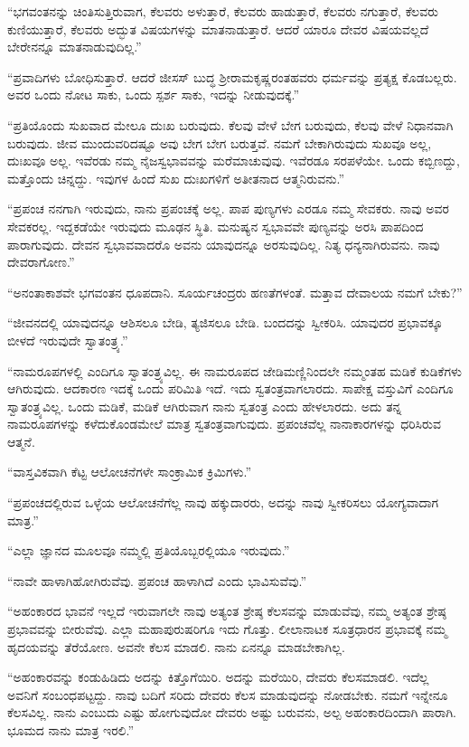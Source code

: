  “ಭಗವಂತನನ್ನು ಚಿಂತಿಸುತ್ತಿರುವಾಗ, ಕೆಲವರು ಅಳುತ್ತಾರೆ, ಕೆಲವರು ಹಾಡುತ್ತಾರೆ, ಕೆಲವರು ನಗುತ್ತಾರೆ, ಕೆಲವರು ಕುಣಿಯುತ್ತಾರೆ, ಕೆಲವರು ಅದ್ಭುತ ವಿಷಯಗಳನ್ನು ಮಾತನಾಡುತ್ತಾರೆ. ಆದರೆ ಯಾರೂ ದೇವರ ವಿಷಯವಲ್ಲದೆ ಬೇರೇನನ್ನೂ ಮಾತನಾಡುವುದಿಲ್ಲ.” 

 “ಪ್ರವಾದಿಗಳು ಬೋಧಿಸುತ್ತಾರೆ. ಆದರೆ ಜೀಸಸ್ ಬುದ್ಧ ಶ‍್ರೀರಾಮಕೃಷ್ಣರಂತಹವರು ಧರ್ಮವನ್ನು ಪ್ರತ್ಯಕ್ಷ ಕೊಡಬಲ್ಲರು. ಅವರ ಒಂದು ನೋಟ ಸಾಕು, ಒಂದು ಸ್ಪರ್ಶ ಸಾಕು, ಇದನ್ನು ನೀಡುವುದಕ್ಕೆ.” 

 “ಪ್ರತಿಯೊಂದು ಸುಖವಾದ ಮೇಲೂ ದುಃಖ ಬರುವುದು. ಕೆಲವು ವೇಳೆ ಬೇಗ ಬರುವುದು, ಕೆಲವು ವೇಳೆ ನಿಧಾನವಾಗಿ ಬರುವುದು. ಜೀವ ಮುಂದುವರಿದಷ್ಟೂ ಅವು ಬೇಗ ಬೇಗ ಬರುತ್ತವೆ. ನಮಗೆ ಬೇಕಾಗಿರುವುದು ಸುಖವೂ ಅಲ್ಲ, ದುಃಖವೂ ಅಲ್ಲ. ಇವೆರಡು ನಮ್ಮ ನೈಜಸ್ವಭಾವವನ್ನು ಮರೆಮಾಚುವುವು. ಇವೆರಡೂ ಸರಪಳೆಯೇ. ಒಂದು ಕಬ್ಬಿಣದ್ದು, ಮತ್ತೊಂದು ಚಿನ್ನದ್ದು. ಇವುಗಳ ಹಿಂದೆ ಸುಖ ದುಃಖಗಳಿಗೆ ಅತೀತನಾದ ಆತ್ಮನಿರುವನು.” 

 “ಪ್ರಪಂಚ ನನಗಾಗಿ ಇರುವುದು, ನಾನು ಪ್ರಪಂಚಕ್ಕೆ ಅಲ್ಲ. ಪಾಪ ಪುಣ್ಯಗಳು ಎರಡೂ ನಮ್ಮ ಸೇವಕರು. ನಾವು ಅವರ ಸೇವಕರಲ್ಲ. ಇದ್ದಕಡೆಯೇ ಇರುವುದು ಮೂಢನ ಸ್ಥಿತಿ. ಮನುಷ್ಯನ ಸ್ವಭಾವವೇ ಪುಣ್ಯವನ್ನು ಅರಸಿ ಪಾಪದಿಂದ ಪಾರಾಗುವುದು. ದೇವನ ಸ್ವಭಾವವಾದರೊ ಅವನು ಯಾವುದನ್ನೂ ಅರಸುವುದಿಲ್ಲ. ನಿತ್ಯ ಧನ್ಯನಾಗಿರುವನು. ನಾವು ದೇವರಾಗೋಣ.” 

 “ಅನಂತಾಕಾಶವೇ ಭಗವಂತನ ಧೂಪದಾನಿ. ಸೂರ್ಯಚಂದ್ರರು ಹಣತೆಗಳಂತೆ. ಮತ್ತಾವ ದೇವಾಲಯ ನಮಗೆ ಬೇಕು?” 

 “ಜೀವನದಲ್ಲಿ ಯಾವುದನ್ನೂ ಆಶಿಸಲೂ ಬೇಡಿ, ತ್ಯಜಿಸಲೂ ಬೇಡಿ. ಬಂದದನ್ನು ಸ್ವೀಕರಿಸಿ. ಯಾವುದರ ಪ್ರಭಾವಕ್ಕೂ ಬೀಳದೆ ಇರುವುದೇ ಸ್ವಾತಂತ್ರ್ಯ.” 

 “ನಾಮರೂಪಗಳಲ್ಲಿ ಎಂದಿಗೂ ಸ್ವಾತಂತ್ರ್ಯವಿಲ್ಲ. ಈ ನಾಮರೂಪದ ಜೇಡಿಮಣ್ಣಿನಿಂದಲೇ ನಮ್ಮಂತಹ ಮಡಿಕೆ ಕುಡಿಕೆಗಳು ಆಗಿರುವುದು. ಆದಕಾರಣ ಇದಕ್ಕೆ ಒಂದು ಪರಿಮಿತಿ ಇದೆ. ಇದು ಸ್ವತಂತ್ರವಾಗಲಾರದು. ಸಾಪೇಕ್ಷ ವಸ್ತುವಿಗೆ ಎಂದಿಗೂ ಸ್ವಾತಂತ್ರ್ಯವಿಲ್ಲ. ಒಂದು ಮಡಿಕೆ, ಮಡಿಕೆ ಆಗಿರುವಾಗ ನಾನು ಸ್ವತಂತ್ರ ಎಂದು ಹೇಳಲಾರದು. ಅದು ತನ್ನ ನಾಮರೂಪಗಳನ್ನು ಕಳೆದುಕೊಂಡಮೇಲೆ ಮಾತ್ರ ಸ್ವತಂತ್ರವಾಗುವುದು. ಪ್ರಪಂಚವೆಲ್ಲ ನಾನಾಕಾರಗಳನ್ನು ಧರಿಸಿರುವ ಆತ್ಮನೆ. 

 “ವಾಸ್ತವಿಕವಾಗಿ ಕೆಟ್ಟ ಆಲೋಚನೆಗಳೇ ಸಾಂಕ್ರಾಮಿಕ ಕ್ರಿಮಿಗಳು.” 

 “ಪ್ರಪಂಚದಲ್ಲಿರುವ ಒಳ್ಳೆಯ ಆಲೋಚನೆಗೆಲ್ಲ ನಾವು ಹಕ್ಕುದಾರರು, ಅದನ್ನು ನಾವು ಸ್ವೀಕರಿಸಲು ಯೋಗ್ಯವಾದಾಗ ಮಾತ್ರ.” 

 “ಎಲ್ಲಾ ಜ್ಞಾನದ ಮೂಲವೂ ನಮ್ಮಲ್ಲಿ ಪ್ರತಿಯೊಬ್ಬರಲ್ಲಿಯೂ ಇರುವುದು.” 

 “ನಾವೇ ಹಾಳಾಗಿಹೋಗಿರುವೆವು. ಪ್ರಪಂಚ ಹಾಳಾಗಿದೆ ಎಂದು ಭಾವಿಸುವೆವು.” 

 “ಅಹಂಕಾರದ ಭಾವನೆ ಇಲ್ಲದೆ ಇರುವಾಗಲೇ ನಾವು ಅತ್ಯಂತ ಶ್ರೇಷ್ಠ ಕೆಲಸವನ್ನು ಮಾಡುವೆವು, ನಮ್ಮ ಅತ್ಯಂತ ಶ್ರೇಷ್ಠ ಪ್ರಭಾವವನ್ನು ಬೀರುವೆವು. ಎಲ್ಲಾ ಮಹಾಪುರುಷರಿಗೂ ಇದು ಗೊತ್ತು. ಲೀಲಾನಾಟಕ ಸೂತ್ರಧಾರನ ಪ್ರಭಾವಕ್ಕೆ ನಮ್ಮ ಹೃದಯವನ್ನು ತೆರೆಯೋಣ. ಅವನೇ ಕೆಲಸ ಮಾಡಲಿ. ನಾನು ಏನನ್ನೂ ಮಾಡಬೇಕಾಗಿಲ್ಲ. 

 “ಅಹಂಕಾರವನ್ನು ಕಂಡುಹಿಡಿದು ಅದನ್ನು ಕಿತ್ತೊಗೆಯಿರಿ. ಅದನ್ನು ಮರೆಯಿರಿ, ದೇವರು ಕೆಲಸಮಾಡಲಿ. ಇದೆಲ್ಲ ಅವನಿಗೆ ಸಂಬಂಧಪಟ್ಟದ್ದು. ನಾವು ಬದಿಗೆ ಸರಿದು ದೇವರು ಕೆಲಸ ಮಾಡುವುದನ್ನು ನೋಡಬೇಕು. ನಮಗೆ ಇನ್ನೇನೂ ಕೆಲಸವಿಲ್ಲ. ನಾನು ಎಂಬುದು ಎಷ್ಟು ಹೋಗುವುದೋ ದೇವರು ಅಷ್ಟು ಬರುವನು, ಅಲ್ಪ ಅಹಂಕಾರದಿಂದಾಗಿ ಪಾರಾಗಿ. ಭೂಮದ ನಾನು ಮಾತ್ರ ಇರಲಿ.” 

